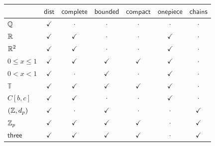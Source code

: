 \begin{center}
\renewcommand{\arraystretch}{1.3}
{\small
\setlength{\tabcolsep}{5pt}
\begin{tabular}{l|cccccc}
 & $\mathsf{dist}$ & $\mathsf{complete}$ & $\mathsf{bounded}$ & $\mathsf{compact}$ & $\mathsf{onepiece}$ & $\mathsf{chains}$ \\ \hline
$\mathbb{Q}$ & $\checkmark$ & $\cdot$ & $\cdot$ & $\cdot$ & $\cdot$ & $\cdot$ \\
$\mathbb{R}$ & $\checkmark$ & $\checkmark$ & $\cdot$ & $\cdot$ & $\checkmark$ & $\cdot$ \\
$\mathbb{R}^2$ & $\checkmark$ & $\checkmark$ & $\cdot$ & $\cdot$ & $\checkmark$ & $\cdot$ \\
$0 \le x \le 1$ & $\checkmark$ & $\checkmark$ & $\checkmark$ & $\checkmark$ & $\checkmark$ & $\cdot$ \\
$0 < x < 1$ & $\checkmark$ & $\cdot$ & $\checkmark$ & $\cdot$ & $\checkmark$ & $\cdot$ \\
$\mathbb{T}$ & $\checkmark$ & $\checkmark$ & $\checkmark$ & $\checkmark$ & $\checkmark$ & $\cdot$ \\
$C[b,c]$ & $\checkmark$ & $\checkmark$ & $\cdot$ & $\cdot$ & $\checkmark$ & $\cdot$ \\
$(\mathbb{Z}, d_p)$ & $\checkmark$ & $\cdot$ & $\checkmark$ & $\cdot$ & $\cdot$ & $\checkmark$ \\
$\mathbb{Z}_p$ & $\checkmark$ & $\checkmark$ & $\checkmark$ & $\checkmark$ & $\cdot$ & $\checkmark$ \\
$\mathsf{three}$ & $\checkmark$ & $\checkmark$ & $\checkmark$ & $\checkmark$ & $\cdot$ & $\checkmark$ \\
\end{tabular}
}
\end{center}

